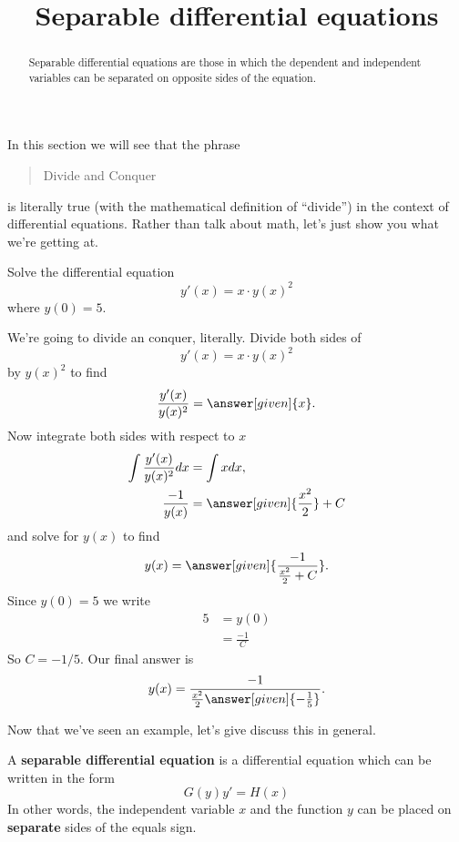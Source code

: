 \documentclass{ximera}
\title[Dig-In:]{Separable differential equations}
\begin{document}
\begin{abstract}
  Separable differential equations are those in which the dependent and independent variables can be separated on opposite sides of the equation.
\end{abstract}
\maketitle

In this section we will see that the phrase
\begin{quote}
  Divide and Conquer
\end{quote}
is literally true (with the mathematical definition of ``divide'') in
the context of differential equations. Rather than talk about math,
let's just show you what we're getting at.

\begin{example}
  Solve the differential equation
  \[
  y'(x) = x\cdot y(x)^2
  \]
  where $y(0)= 5$.
  \begin{explanation}
    We're going to divide an conquer, literally. Divide both sides of
    \[
    y'(x) = x\cdot y(x)^2
    \]
    by $y(x)^2$ to find
    \[
    \frac{y'(x)}{y(x)^2} = \answer[given]{x}.
    \]
    Now integrate both sides with respect to $x$
    \begin{align*}
      \int \frac{y'(x)}{y(x)^2} dx &= \int x dx,\\
      \frac{-1}{y(x)} &= \answer[given]{\frac{x^2}{2}}+C
    \end{align*}
    and solve for $y(x)$ to find
    \[
    y(x) = \answer[given]{\frac{-1}{\frac{x^2}{2}+C}}.
    \]
    Since $y(0) =5$ we write
    \begin{align*}
    5&= y(0)\\
    &=\frac{-1}{C}
    \end{align*}
    So $C= -1/5$. Our final answer is
    \[
    y(x) = \frac{-1}{\frac{x^2}{2} \answer[given]{-\frac{1}{5}}}.
    \]
  \end{explanation}
\end{example}

Now that we've seen an example, let's give discuss this in general.

\begin{definition}
  A \textbf{separable differential equation} is a differential equation
  which can be written in the form
  \[
  G(y) y' = H(x)
  \]
  In other words, the independent variable $x$ and the function $y$
  can be placed on \textbf{separate} sides of the equals sign.
\end{definition}
\end{document}
